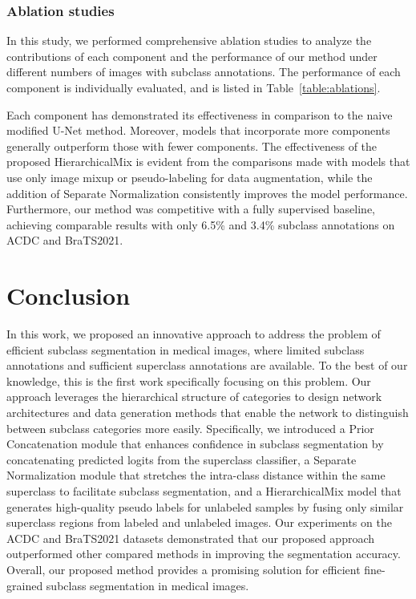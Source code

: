 \documentclass[runningheads]{llncs}
\begin{document}
\subsubsection{Ablation studies} 
In this study, we performed comprehensive ablation studies to analyze the contributions of each component and the performance of our method under different numbers of images with subclass annotations. The performance of each component is individually evaluated, and is listed in Table~\ref{table:ablations}.

\par Each component has demonstrated its effectiveness in comparison to the naive modified U-Net method. Moreover, models that incorporate more components generally outperform those with fewer components. The effectiveness of the proposed HierarchicalMix is evident from the comparisons made with models that use only image mixup or pseudo-labeling for data augmentation, while the addition of Separate Normalization consistently improves the model performance. Furthermore, our method was competitive with a fully supervised baseline, achieving comparable results with only 6.5\% and 3.4\% subclass annotations on ACDC and BraTS2021.

\section{Conclusion}
In this work, we proposed an innovative approach to address the problem of efficient subclass segmentation in medical images, where limited subclass annotations and sufficient superclass annotations are available. To the best of our knowledge, this is the first work specifically focusing on this problem. Our approach leverages the hierarchical structure of categories to design network architectures and data generation methods that enable the network to distinguish between subclass categories more easily. Specifically, we introduced a Prior Concatenation module that enhances confidence in subclass segmentation by concatenating predicted logits from the superclass classifier, a Separate Normalization module that stretches the intra-class distance within the same superclass to facilitate subclass segmentation, and a HierarchicalMix model that generates high-quality pseudo labels for unlabeled samples by fusing only similar superclass regions from labeled and unlabeled images. Our experiments on the ACDC and BraTS2021 datasets demonstrated that our proposed approach outperformed other compared methods in improving the segmentation accuracy. Overall, our proposed method provides a promising solution for efficient fine-grained subclass segmentation in medical images.
\end{document}
